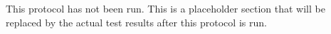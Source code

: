 This protocol has not been run.  This is a placeholder section that will be
replaced by the actual test results after this protocol is run.
